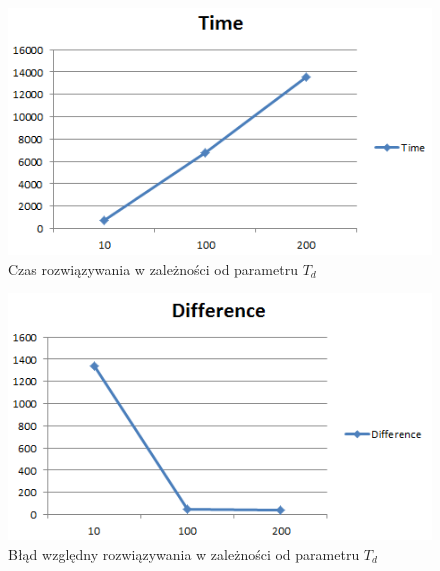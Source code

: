 \documentclass[wide,a4paper,titlepage,12pt] {article}
\begin{document}
\begin{figure}[htbp]
  \begin{center}
         \includegraphics[scale=0.8]{charts/time100.PNG}
         \caption{Czas rozwiązywania w zależności od parametru $T_d$}
  \end{center}
\end{figure}

\begin{figure}[htbp]
  \begin{center}
         \includegraphics[scale=0.8]{charts/diff100.PNG}
         \caption{Błąd względny rozwiązywania w zależności od parametru $T_d$}
  \end{center}
\end{figure}
\newpage
\end{document}
